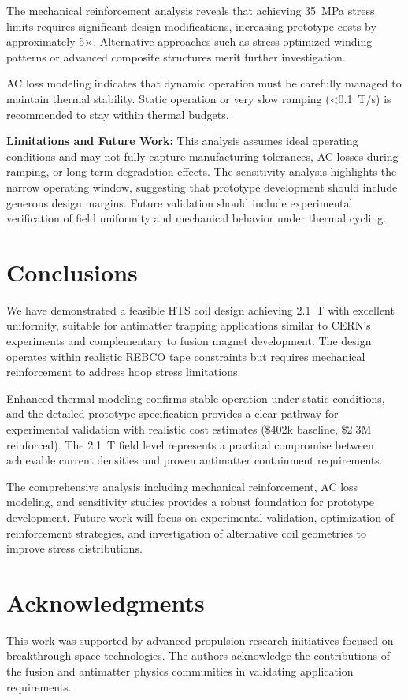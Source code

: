 \documentclass[journal]{IEEEtran}
\begin{document}
The mechanical reinforcement analysis reveals that achieving 35~MPa stress limits requires significant design modifications, increasing prototype costs by approximately 5$\times$. Alternative approaches such as stress-optimized winding patterns or advanced composite structures merit further investigation.

AC loss modeling indicates that dynamic operation must be carefully managed to maintain thermal stability. Static operation or very slow ramping (<0.1~T/s) is recommended to stay within thermal budgets.

\textbf{Limitations and Future Work:} This analysis assumes ideal operating conditions and may not fully capture manufacturing tolerances, AC losses during ramping, or long-term degradation effects. The sensitivity analysis highlights the narrow operating window, suggesting that prototype development should include generous design margins. Future validation should include experimental verification of field uniformity and mechanical behavior under thermal cycling.

\section{Conclusions}
We have demonstrated a feasible HTS coil design achieving 2.1~T with excellent uniformity, suitable for antimatter trapping applications similar to CERN's experiments and complementary to fusion magnet development. The design operates within realistic REBCO tape constraints but requires mechanical reinforcement to address hoop stress limitations.

Enhanced thermal modeling confirms stable operation under static conditions, and the detailed prototype specification provides a clear pathway for experimental validation with realistic cost estimates (\$402k baseline, \$2.3M reinforced). The 2.1~T field level represents a practical compromise between achievable current densities and proven antimatter containment requirements.

The comprehensive analysis including mechanical reinforcement, AC loss modeling, and sensitivity studies provides a robust foundation for prototype development. Future work will focus on experimental validation, optimization of reinforcement strategies, and investigation of alternative coil geometries to improve stress distributions.

\section{Acknowledgments}
This work was supported by advanced propulsion research initiatives focused on breakthrough space technologies. The authors acknowledge the contributions of the fusion and antimatter physics communities in validating application requirements.
\end{document}
